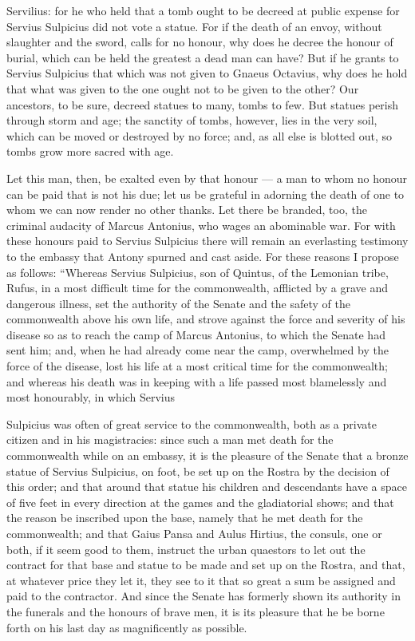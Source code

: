  Servilius: for he who held that a tomb ought to be decreed at public expense for Servius Sulpicius did not vote a statue. For if the death of an envoy, without slaughter and the sword, calls for no honour, why does he decree the honour of burial, which can be held the greatest a dead man can have? But if he grants to Servius Sulpicius that which was not given to Gnaeus Octavius, why does he hold that what was given to the one ought not to be given to the other? Our ancestors, to be sure, decreed statues to many, tombs to few. But statues perish through storm and age; the sanctity of tombs, however, lies in the very soil, which can be moved or destroyed by no force; and, as all else is blotted out, so tombs grow more sacred with age.

 Let this man, then, be exalted even by that honour --- a man to whom no honour can be paid that is not his due; let us be grateful in adorning the death of one to whom we can now render no other thanks. Let there be branded, too, the criminal audacity of Marcus Antonius, who wages an abominable war. For with these honours paid to Servius Sulpicius there will remain an everlasting testimony to the embassy that Antony spurned and cast aside. For these reasons I propose as follows: ``Whereas Servius Sulpicius, son of Quintus, of the Lemonian tribe, Rufus, in a most difficult time for the commonwealth, afflicted by a grave and dangerous illness, set the authority of the Senate and the safety of the commonwealth above his own life, and strove against the force and severity of his disease so as to reach the camp of Marcus Antonius, to which the Senate had sent him; and, when he had already come near the camp, overwhelmed by the force of the disease, lost his life at a most critical time for the commonwealth; and whereas his death was in keeping with a life passed most blamelessly and most honourably, in which Servius

 Sulpicius was often of great service to the commonwealth, both as a private citizen and in his magistracies: since such a man met death for the commonwealth while on an embassy, it is the pleasure of the Senate that a bronze statue of Servius Sulpicius, on foot, be set up on the Rostra by the decision of this order; and that around that statue his children and descendants have a space of five feet in every direction at the games and the gladiatorial shows; and that the reason be inscribed upon the base, namely that he met death for the commonwealth; and that Gaius Pansa and Aulus Hirtius, the consuls, one or both, if it seem good to them, instruct the urban quaestors to let out the contract for that base and statue to be made and set up on the Rostra, and that, at whatever price they let it, they see to it that so great a sum be assigned and paid to the contractor. And since the Senate has formerly shown its authority in the funerals and the honours of brave men, it is its pleasure that he be borne forth on his last day as magnificently as possible.

